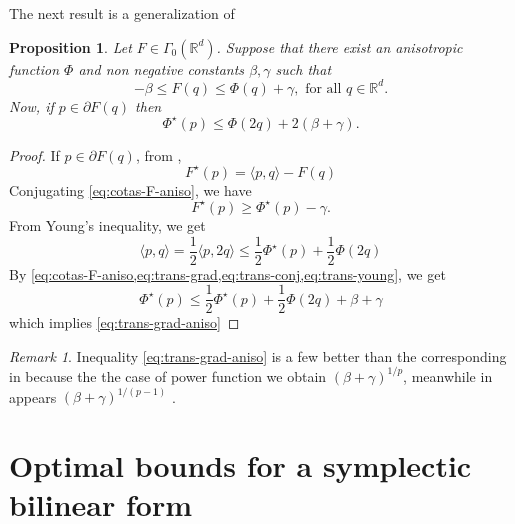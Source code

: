 \documentclass[twoside]{article}
\newtheorem{prop}[thm]{Proposition}
\theoremstyle{remark}
\newtheorem{comentario}{Remark}
\newcommand{\rr}{\mathbb{R}}
\renewcommand{\leq}{\leqslant}
\renewcommand{\geq}{\geqslant}
\newcommand{\Phie}{\Phi^{\star}}
\begin{document}
The next result is a generalization of \cite[Prop. 2.2, p.34]{mawhin2010critical}

\begin{prop}\label{prop: cota-conj-phi}
Let $F \in  \Gamma_0(\rr^d)$. Suppose that there exist an anisotropic function $\Phi$ and
non negative  constants $\beta,\gamma$ such that
\begin{equation}\label{eq:cotas-F-aniso}
-\beta \leq F(q) \leq \Phi(q)+\gamma, \mbox{ for all } q \in \rr^d. 
\end{equation}
Now, if $p \in \partial F(q)$ then 
\begin{equation}\label{eq:trans-grad-aniso}
\Phie(p)\leq \Phi(2q)+2(\beta+\gamma).
\end{equation}
\end{prop}

\begin{proof}
If $p \in \partial F(q)$, from \cite[Thm. 2.2, p.33]{mawhin2010critical}, 
\begin{equation}\label{eq:trans-grad}
F^\star(p)=\langle p,q \rangle-F(q)
\end{equation}
Conjugating \eqref{eq:cotas-F-aniso}, we have
\begin{equation}\label{eq:trans-conj}
F^\star(p)\geq \Phie(p)-\gamma.
\end{equation}
From Young's inequality, we get
\begin{equation}\label{eq:trans-young}
\langle p,q \rangle =\frac{1}{2} \langle p,2q \rangle \leq \frac{1}{2 }\Phie(p)+\frac{1}{2}\Phi(2q)
\end{equation}
By \cref{eq:cotas-F-aniso,eq:trans-grad,eq:trans-conj,eq:trans-young}, we get
\[
\Phie(p)\leq \frac{1}{2}\Phie(p)+\frac{1}{2}\Phi(2q)+\beta+\gamma
\]
which implies \eqref{eq:trans-grad-aniso}
\end{proof}

\begin{comentario} Inequality \eqref{eq:trans-grad-aniso} is a few better than the corresponding in \cite[Prop. 2.2]{mawhin2010critical} because the the case of power function  we obtain $(\beta+\gamma)^{1/p}$, meanwhile in \cite{mawhin2010critical} appears $(\beta+\gamma)^{1/(p-1)}$ .

\end{comentario}


\section{Optimal bounds for a symplectic bilinear form}
\end{document}
